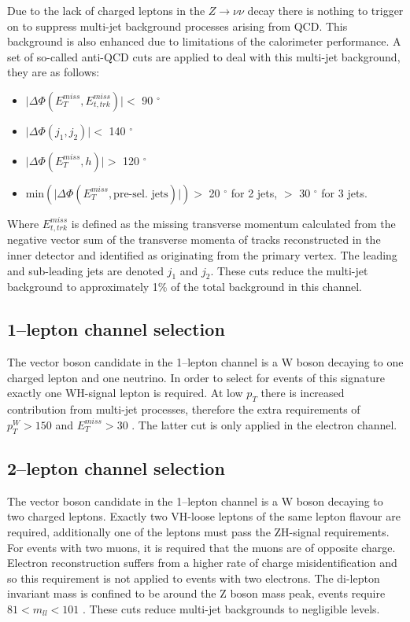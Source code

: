 Due to the lack of charged leptons in the $Z \rightarrow \nu\nu$ decay there is
nothing to trigger on to suppress multi-jet background processes arising from
QCD. This background is also enhanced due to limitations of the calorimeter
performance. A set of so-called anti-QCD cuts are applied to deal with this
multi-jet background, they are as follows:
\begin{itemize}
\item $\lvert \Delta \Phi ( E_T^{miss} , E_{t, trk}^{miss} ) \rvert <$ 90 $^\circ$
\item $\lvert \Delta \Phi ( j_1 , j_2 ) \rvert <$ 140 $^\circ$
\item $\lvert \Delta \Phi ( E_T^{miss} , h ) \rvert >$ 120 $^\circ$
\item $\text{min} ( \lvert \Delta \Phi ( E_T^{miss} , \text{pre-sel. jets}) \rvert ) >$ 20 $^\circ$ for  2 jets, $>$ 30 $^\circ$ for 3 jets.
\end{itemize}
Where $E_{t, trk}^{miss}$ is defined as the missing transverse momentum
calculated from the negative vector sum of the transverse momenta of tracks
reconstructed in the inner detector and identified as originating from the
primary vertex. The leading and sub-leading jets are denoted $j_1$ and $j_2$.
These cuts reduce the multi-jet background to approximately 1\% of the total
background in this channel.


\subsection{1--lepton channel selection}
\label{sec:1lep-selection}

The vector boson candidate in the 1--lepton channel is a W boson decaying to one
charged lepton and one neutrino. In order to select for events of this signature
exactly one WH-signal lepton is required. At low $p_T$ there is increased
contribution from multi-jet processes, therefore the extra requirements of
$p_T^{W} > 150$ \GeV and $E_T^{miss} > 30$ \GeV. The latter cut is only applied in
the electron channel.  

\subsection{2--lepton channel selection}
\label{sec:2lep-selection}

The vector boson candidate in the 1--lepton channel is a W boson decaying to two
charged leptons. Exactly two VH-loose leptons of the same lepton flavour are
required, additionally one of the leptons must pass the ZH-signal requirements.
For events with two muons, it is required that the muons are of opposite charge.
Electron reconstruction suffers from a higher rate of charge misidentification
and so this requirement is not applied to events with two electrons. The
di-lepton invariant mass is confined to be around the Z boson mass peak, events
require $81 < m_{ll} < 101$ \GeV. These cuts reduce multi-jet backgrounds to
negligible levels. 

